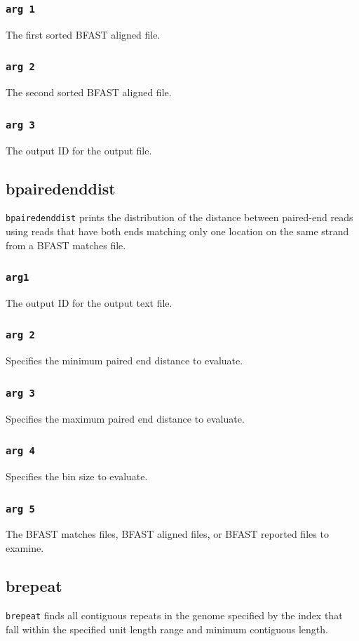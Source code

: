\documentclass[a4paper,12pt]{book}
\newcommand{\TT}[1]{{\tt #1}} %
\newcommand{\BMF}{BFAST matches file} %
\newcommand{\BAF}{BFAST aligned file} %
\newcommand{\BRF}{BFAST reported file} %
\begin{document}
\subsubsection{\TT{arg 1}}
The first sorted \BAF{}.
\subsubsection{\TT{arg 2}}
The second sorted \BAF{}.
\subsubsection{\TT{arg 3}}
The output ID for the output file.

\subsection{bpairedenddist}
\label{sec:bpairedenddist}
\TT{bpairedenddist} prints the distribution of the distance between paired-end reads using reads that have both ends matching only one location on the same strand from a \BMF{}.
\subsubsection{\TT{arg1}}
The output ID for the output text file.
\subsubsection{\TT{arg 2}}
Specifies the minimum paired end distance to evaluate.
\subsubsection{\TT{arg 3}}
Specifies the maximum paired end distance to evaluate.
\subsubsection{\TT{arg 4}}
Specifies the bin size to evaluate.
\subsubsection{\TT{arg 5}}
The \BMF{s}, \BAF{s}, or \BRF{s} to examine.
\subsection{brepeat}
\label{sec:brepeat}
\TT{brepeat} finds all contiguous repeats in the genome specified by the index that fall within the specified unit length range and minimum contiguous length.
\end{document}
